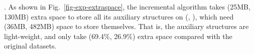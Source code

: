 
. As shown in Fig.~\ref{fig-exp-extraspace}, the incremental algorithm \inc takes (25MB, 130MB) extra space to store all its auxiliary structures on (\citationd, \synthetic), which need (36MB, 482MB) space to store themselves.
That is, the auxiliary structures are light-weight, and only take (69.4\%, 26.9\%) extra space compared with the original datasets.





